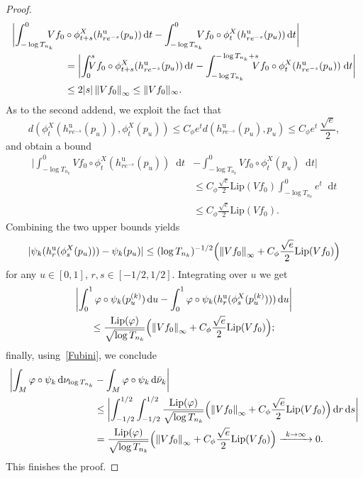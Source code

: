 \documentclass[JEP,XML,SOM,NoEqCountersInSection,Unicode,published]{cedram}
\newcommand\To[1]{\mathchoice{\xrightarrow{\kern4pt#1\kern3pt}}{\stackrel{#1}{\longrightarrow}}{}{}}
\newcommand{\nnorm}[1]{\lVert#1\rVert}
\newcommand*{\diff}{\mathop{}\!\mathrm{d}}
\newcommand{\norm}[1]{\left\lVert#1\right\rVert}
\theoremstyle{definition}
\begin{document}
\begin{appendix}
\begin{proof}
\begin{align*}
\biggl|\int_{-\log{T_{n_k}}}^{0}\hspace*{-3mm}Vf_0&\circ \phi^{X}_{t+s}(h^{\mathrm{u}}_{re^{-s}}(p_u))\diff t-\int_{-\log{T_{n_k}}}^{0}\hspace*{-3mm}Vf_0\circ \phi^{X}_{t}(h^{\mathrm{u}}_{re^{-s}}(p_u))\diff t\biggr|\\
&=
\biggl|\int_{0}^{s}\hspace*{-3mm}Vf_0\circ \phi^{X}_{t+s}(h^{\mathrm{u}}_{re^{-s}}(p_u))\diff t-\int_{-\log{T_{n_k}}}^{-\log{T_{n_k}}+s}\hspace*{-3mm}Vf_0\circ \phi^{X}_{t}(h^{\mathrm{u}}_{re^{-s}}(p_u))\;
\text{d}t\biggr|\\
&\leq 2|s|\norm{Vf_0}_{\infty}\leq \nnorm{Vf_0}_{\infty}.
\end{align*}
As to the second addend, we exploit the fact that
\begin{equation*}d(\phi^{X}_t(h^{\mathrm{u}}_{re^{-s}}(p_u)),\phi^{X}_t(p_u))\leq C_{\phi}e^{t}d(h^{\mathrm{u}}_{re^{-s}}(p_u),p_u)\leq C_{\phi}e^{t}\,\frac{\sqrt{e}}{2},
\end{equation*}
and obtain a bound
\begin{align*}
\biggl|\int_{-\log{T_{n_k}}}^{0}Vf_0\circ \phi^{X}_{t}(h^{\mathrm{u}}_{re^{-s}}(p_u))\diff t&-\int_{-\log{T_{n_k}}}^{0}Vf_0\circ \phi_t^{X}(p_u)\diff t\biggr|\\
&\leq C_{\phi}\frac{\sqrt{e}}{2}\text{Lip}(Vf_0)\int_{-\log{T_{n_k}}}^{0}e^{t}\diff t\\
&\leq C_{\phi}\frac{\sqrt{e}}{2}\text{Lip}(Vf_0).
\end{align*}
Combining the two upper bounds yields
\begin{equation*}
|\psi_k(h^{\mathrm{u}}_r(\phi^{X}_s(p_u)))-\psi_k(p_u)|\leq (\log{T_{n_k}})^{-1/2}\Bigl(\norm{Vf_0}_{\infty}+C_{\phi}\frac{\sqrt{e}}{2}\text{Lip}(Vf_0)\Bigr)
\end{equation*}
for any $u\in [0,1]$, $r,s\in [-1/2,1/2]$. Integrating over $u$ we get
\begin{multline*}
\biggl|\int_{0}^{1}\varphi\circ\psi_k(p_u^{(k)})\diff u-\int_{0}^{1}\varphi\circ\psi_k(h^{\mathrm{u}}_r(\phi^{X}_{s}(p_u^{(k)})))\diff u\biggr|\\
\leq \frac{\text{Lip}(\varphi)}{\sqrt{\log{T_{n_k}}}}\Bigl(\norm{Vf_0}_{\infty}+C_{\phi}\frac{\sqrt{e}}{2}\text{Lip}(Vf_0)\Bigr);
\end{multline*}
finally, using~\eqref{Fubini}, we conclude
\begin{align*}
\biggl|\int_{M}\varphi\circ \psi_k\diff \nu_{\log{T_{n_k}}}&-\int_{M}\varphi\circ \psi_k\diff \bar{\nu}_k \biggr|\\
&\leq\biggl|\int_{-1/2}^{1/2}\int_{-1/2}^{1/2}\frac{\text{Lip}(\varphi)}{\sqrt{\log{T_{n_k}}}} \Bigl(\norm{Vf_0}_{\infty}+C_{\phi}\frac{\sqrt{e}}{2}\text{Lip}(Vf_0) \Bigr)\diff r\diff s\biggr|\\
&= \frac{\text{Lip}(\varphi)}{\sqrt{\log{T_{n_k}}}}\Bigl(\norm{Vf_0}_{\infty}+C_{\phi}\frac{\sqrt{e}}{2}\text{Lip}(Vf_0)\Bigr)\To{k\to\infty}0.
\end{align*}
This finishes the proof.
\end{proof}

\end{appendix}

\backmatter


\end{document}
